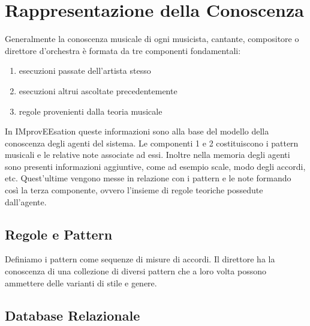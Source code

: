 \section{Rappresentazione della Conoscenza}
Generalmente la conoscenza musicale di ogni musicista, cantante,
compositore o direttore d'orchestra è formata da tre 
componenti fondamentali:
\begin{enumerate}
\item esecuzioni passate dell'artista stesso
\item esecuzioni altrui ascoltate precedentemente
\item regole provenienti dalla teoria musicale
\end{enumerate}

In IMprovEEsation queste informazioni sono alla base del modello della
conoscenza degli agenti del sistema. Le componenti 1 e 2 costituiscono i
pattern musicali e le relative note associate ad essi. Inoltre nella memoria
degli agenti sono presenti informazioni aggiuntive, come ad esempio
scale, modo degli accordi, etc. Quest'ultime vengono messe in relazione
con i pattern e le note formando così la terza componente, ovvero l'insieme 
di regole teoriche possedute dall'agente.
\subsection{Regole e Pattern}
Definiamo i pattern come sequenze di misure di accordi. %
Il direttore ha la conoscenza di una collezione di diversi pattern che
a loro volta possono ammettere delle varianti di stile e genere.
\subsection{Database Relazionale}
